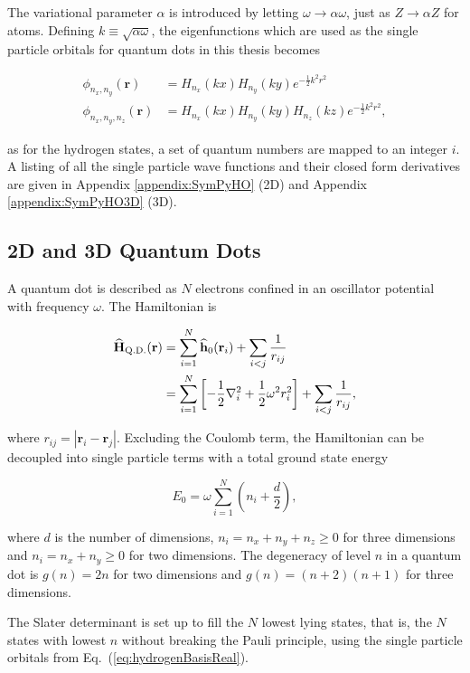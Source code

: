 The variational parameter $\alpha$ is introduced by letting $\omega\to\alpha\omega$, just as $Z\to\alpha Z$ for atoms. Defining $k\equiv\sqrt{\alpha\omega}$, the eigenfunctions which are used as the single particle orbitals for quantum dots in this thesis becomes

\begin{align}
\phi_{n_x, n_y}(\mathbf{r}) &= H_{n_x}(kx)H_{n_y}(ky)e^{-\frac{1}{2}k^2r^2} \\
\phi_{n_x, n_y, n_z}(\mathbf{r}) &= H_{n_x}(kx)H_{n_y}(ky)H_{n_z}(kz)e^{-\frac{1}{2}k^2r^2},
\end{align}

as for the hydrogen states, a set of quantum numbers are mapped to an integer $i$.  A listing of all the single particle wave functions and their closed form derivatives are given in Appendix \ref{appendix:SymPyHO} (2D) and Appendix \ref{appendix:SymPyHO3D} (3D). 


\subsection{2D and 3D Quantum Dots}

A quantum dot is described as $N$ electrons confined in an oscillator potential with frequency $\omega$. The Hamiltonian is

\begin{align}
 {\bf\widehat{H}}_{\mathrm{Q.D.}}(\mathbf{r}) &= \sum_{i=1}^N {\bf\widehat{h}}_0(\mathbf{r}_i) + \sum_{i<j} \frac{1}{r_{ij}} \\
                         &= \sum_{i=1}^N \left[-\frac{1}{2}\nabla_i^2 + \frac{1}{2}\omega^2r_i^2 \right] + \sum_{i<j} \frac{1}{r_{ij}},
\end{align}

where $r_{ij} = |\mathbf{r}_i -\mathbf{r}_j|$. Excluding the Coulomb term, the Hamiltonian can be decoupled into single particle terms with a total ground state energy

\begin{equation}
 E_0 = \omega\sum_{i=1}^N \left(n_i + \frac{d}{2}\right),
\end{equation}

where $d$ is the number of dimensions, $n_i = n_x + n_y + n_z \ge 0$ for three dimensions and $n_i = n_x + n_y \ge 0$ for two dimensions. The degeneracy of level $n$ in a quantum dot is $g(n) = 2n$ for two dimensions and $g(n) = (n+2)(n+1)$ for three dimensions.

The Slater determinant is set up to fill the $N$ lowest lying states, that is, the $N$ states with lowest $n$ without breaking the Pauli principle, using the single particle orbitals from Eq.~(\ref{eq:hydrogenBasisReal}).


